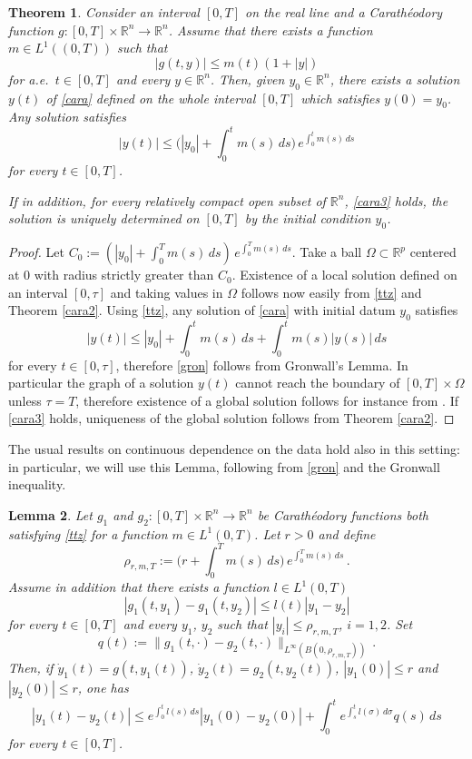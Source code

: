\documentclass[11pt]{article}
\theoremstyle{plain}
\newtheorem{theorem}{Theorem}[section]
\newtheorem{lemma}[theorem]{Lemma}
\theoremstyle{definition}
\theoremstyle{remark}
\numberwithin{equation}{section}
\newcommand{\R}{{\mathbb R}}
\newcommand{\Om}{\Omega}
\begin{document}
\begin{theorem}\label{cara-global}
Consider an interval $[0,T]$ on the real line and a Carath{\'e}odory function $g\colon[0,T]\times \R^n \to \R^n$. Assume that there exists a function $m \in L^1((0,T))$ such that
\begin{equation}\label{ttz}
|g(t,y)|\le m(t)(1+|y|)
\end{equation}
for a.e.\ $t \in [0,T]$ and every $y \in \R^n$. Then, given $y_0 \in \R^n$, there exists a solution $y(t)$ of \eqref{cara} defined on the whole interval $[0,T]$ which satisfies $y(0)=y_0$. Any solution satisfies
\begin{equation}\label{gron}
|y(t)|\le \Big(|y_0|+ \int_0^t m(s)\,ds\Big) \,e^{\int_0^t m(s)\,ds}
\end{equation}
for every $t \in [0,T]$.


If in addition, for every relatively compact open subset of $\R^n$, \eqref{cara3} holds, the solution is uniquely determined on $[0,T]$ by the initial condition $y_0$.
\end{theorem}

\begin{proof}
Let $C_0:= (|y_0|+ \int_0^T m(s)\,ds) \,e^{\int_0^T m(s)\,ds}$. Take a ball $\Om \subset \R^p$  centered at $0$ with radius strictly greater than $C_0$. Existence of a local solution defined on an interval $[0,\tau]$ and taking values in $\Om$ follows now easily from \eqref{ttz} and Theorem \ref{cara2}. Using \eqref{ttz}, any solution of \eqref{cara} with initial datum $y_0$ satisfies
$$
|y(t)|\le |y_0|+ \int_0^t m(s)\,ds+\int_0^t m(s)|y(s)|\,ds
$$
for every $t \in [0,\tau]$, therefore \eqref{gron} follows from Gronwall's Lemma. In particular the graph of a solution $y(t)$ cannot reach the boundary of $[0,T]\times \Om$ unless $\tau=T$, therefore existence of a global solution follows for instance from \cite[Chapter 1, Theorem 4]{Fil}. If \eqref{cara3} holds, uniqueness of the global solution follows from Theorem \ref{cara2}.
\end{proof}

The usual results on continuous dependence on the data hold also in this setting: in particular, we will use this Lemma, following from \eqref{gron} and the Gronwall inequality.

\begin{lemma}
Let $g_1$ and $g_2\colon[0,T]\times \R^n \to \R^n$ be Carath{\'e}odory functions both satisfying \eqref{ttz} for a  function $m \in L^1(0,T)$. Let $r>0$ and define 
$$
\rho_{r, m, T}:=\Big(r+ \int_0^T m(s)\,ds\Big) \,e^{\int_0^T m(s)\,ds}\,.
$$ 
Assume in addition that there exists a function $l\in L^1(0,T)$
$$
|g_1(t, y_1)-g_1(t, y_2)|\le l(t)|y_1-y_2|
$$
for every $t \in [0, T]$ and every $y_1$, $y_2$ such that $|y_i|\le \rho_{r, m, T}$, $i=1,2$.
Set
$$
q(t):=\|g_1(t, \cdot)-g_2(t, \cdot)\|_{L^\infty(B(0, \rho_{r, m, T}))}\,.
$$
Then, if $\dot y_1(t)=g(t, y_1(t))$, $\dot y_2(t)=g_2(t, y_2(t))$, $|y_1(0)|\le r$ and $|y_2(0)|\le r$, one has
\begin{equation}\label{gronvalla}
|y_1(t)-y_2(t)|\le e^{\int_0^t l(s)\,ds}|y_1(0)-y_2(0)|+\int_0^t e^{\int_s^t l(\sigma)\,d\sigma}q(s)\,ds
\end{equation}
for every $t \in [0, T]$.
\end{lemma}
\end{document}
